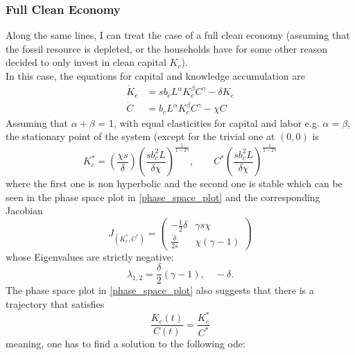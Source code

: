 \subsubsection{Full Clean Economy}
\label{sec:full_clean_economy}
Along the same lines, I can treat the case of a full clean economy (assuming that the fossil resource is depleted, or the households have for some other reason decided to only invest in clean capital $K_c$). \\
In this case, the equations for capital and knowledge accumulation are
\begin{subequations}
\begin{align}
    \dot{K}_c &= s b_c L^{\alpha} K_c^{\beta} C^\gamma - \delta K_c \label{eq:full_clean_ca1} \\
	\dot{C} &= b_c L^\alpha K_c^\beta C^\gamma - \chi C \label{eq:full_clean_ca2}
\end{align}
\end{subequations}
Assuming that $\alpha + \beta$ = 1, with equal elasticities for capital and labor e.g. $\alpha = \beta$, the stationary point of the system (except for the trivial one at $(0, 0)$ is 
\begin{equation}
  K_c^*= \left( \frac{\chi s}{\delta} \right) \left( \frac{s b_c^2 L}{\delta \chi} \right)^{\frac{1}{1-2\gamma}}, \qquad C^*\left( \frac{s b_c^2 L}{\delta \chi} \right)^{\frac{1}{1-2 \gamma}}
	\label{stationary_points}
\end{equation}
where the first one is non hyperbolic and the second one is stable which can be seen in the phase space plot in \cref{phase_space_plot} and the corresponding Jacobian
\begin{equation}
	J_{(K_c^*,C^*)} = 
		\begin{pmatrix}
			-\frac{1}{2}\delta & \gamma s \chi \\
			\frac{\delta}{2 s} & \chi \left(\gamma-1 \right)
		\end{pmatrix}
	\label{eq:learning_jacobian}
\end{equation}
whose Eigenvalues are strictly negative:
\begin{equation}
  \lambda_{1,2} = \frac{\delta}{2}(\gamma-1), \quad -\delta.
	\label{eq:learning_eigenvalues}
\end{equation}
The phase space plot in \cref{phase_space_plot} also suggests that there is a trajectory that satisfies 
\begin{equation}
	\frac{K_c(t)}{C(t)} = \frac{K^*_c}{C^*}
\end{equation}
meaning, one has to find a solution to the following ode:
